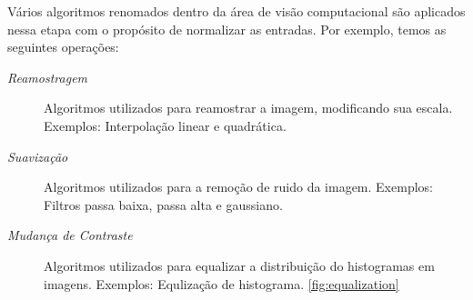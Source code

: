 Vários algoritmos renomados dentro da área de visão computacional são aplicados
nessa etapa com o propósito de normalizar as entradas. Por exemplo, temos
as seguintes operações:

\begin{description}
    \item [\textit{Reamostragem}] Algoritmos utilizados para reamostrar a imagem,
          modificando sua escala. Exemplos: Interpolação linear e quadrática.
    \item [\textit{Suavização}] Algoritmos utilizados para a remoção de ruido da
          imagem. Exemplos: Filtros passa baixa, passa alta e gaussiano.
    \item [\textit{Mudança de Contraste}] Algoritmos utilizados para equalizar
          a distribuição do histogramas em imagens. Exemplos: Equlização de histograma.
          \ref{fig:equalization}
\end{description}

